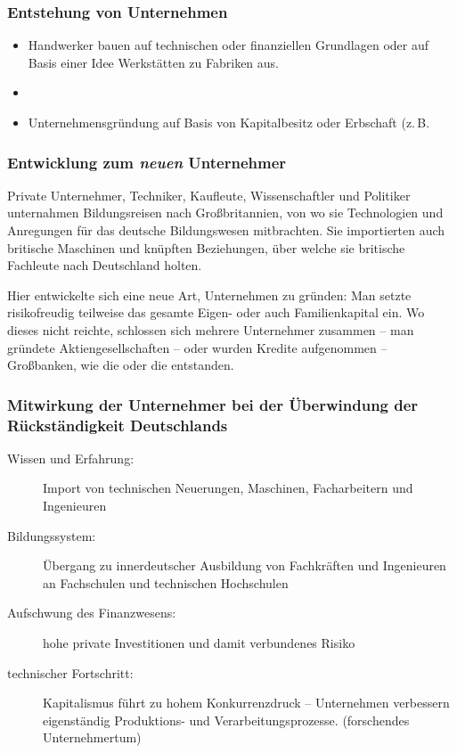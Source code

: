 \subsubsection{Entstehung von Unternehmen}

\begin{itemize}
\item Handwerker bauen auf technischen oder finanziellen Grundlagen
oder auf Basis einer Idee Werkstätten zu Fabriken aus.
\item {}
\item Unternehmensgründung auf Basis von Kapitalbesitz oder Erbschaft
(z.\,B. 
\end{itemize}

\subsubsection{Entwicklung zum \emph{neuen} Unternehmer}

Private Unternehmer, Techniker, Kaufleute, Wissenschaftler und
Politiker unternahmen Bildungsreisen nach Großbritannien, von wo sie
Technologien und Anregungen für das deutsche Bildungswesen
mitbrachten. Sie importierten auch britische Maschinen und knüpften
Beziehungen, über welche sie britische Fachleute nach Deutschland
holten.

Hier entwickelte sich eine neue Art, Unternehmen zu gründen: Man
setzte risikofreudig teilweise das gesamte Eigen- oder auch
Familienkapital ein. Wo dieses nicht reichte, schlossen sich mehrere
Unternehmer zusammen -- man gründete Aktiengesellschaften -- oder
wurden Kredite aufgenommen -- Großbanken, wie die 
oder die  entstanden.

\subsubsection{Mitwirkung der Unternehmer bei der Überwindung der
Rückständigkeit Deutschlands}

\begin{description}
\item[Wissen und Erfahrung:] Import von technischen Neuerungen,
Maschinen, Facharbeitern und Ingenieuren
\item[Bildungssystem:] Übergang zu innerdeutscher Ausbildung von
Fachkräften und Ingenieuren an Fachschulen und technischen Hochschulen
\item[Aufschwung des Finanzwesens:] hohe private Investitionen und
damit verbundenes Risiko
\item[technischer Fortschritt:] Kapitalismus führt zu hohem
Konkurrenzdruck -- Unternehmen verbessern eigenständig Produktions-
und Verarbeitungsprozesse. (forschendes Unternehmertum)
\end{description}

